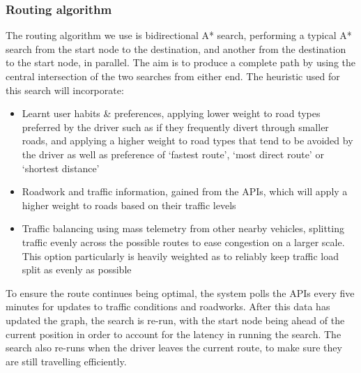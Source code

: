 \documentclass{article}
\begin{document}
\subsubsection{Routing algorithm}\label{sssec:nav-tech-routing}
The routing algorithm we use is bidirectional A* search, performing a typical A* search from the start node to the destination, and another from the destination to the start node, in parallel. The aim is to produce a complete path by using the central intersection of the two searches from either end. The heuristic used for this search will incorporate:
\begin{itemize}
  \item Learnt user habits \& preferences, applying lower weight to road types preferred by the driver such as if they frequently divert through smaller roads, and applying a higher weight to road types that tend to be avoided by the driver as well as preference of `fastest route', `most direct route' or `shortest distance'
  \item Roadwork and traffic information, gained from the APIs, which will apply a higher weight to roads based on their traffic levels
  \item Traffic balancing using mass telemetry from other nearby vehicles, splitting traffic evenly across the possible routes to ease congestion on a larger scale. This option particularly is heavily weighted as to reliably keep traffic load split as evenly as possible
\end{itemize}
To ensure the route continues being optimal, the system polls the APIs every five minutes for updates to traffic conditions and roadworks. After this data has updated the graph, the search is re-run, with the start node being ahead of the current position in order to account for the latency in running the search. The search also re-runs when the driver leaves the current route, to make sure they are still travelling efficiently.
\end{document}
